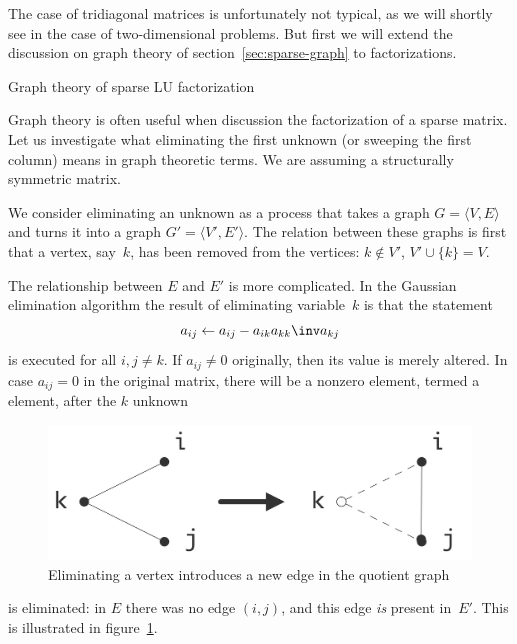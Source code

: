 The case of tridiagonal matrices is unfortunately not typical, as we
will shortly see in the case of two-dimensional problems. But first we
will extend the discussion on graph theory of
section~\ref{sec:sparse-graph} to factorizations.

 {Graph theory of sparse LU factorization}
\label{sec:lu-graph}

Graph theory is often useful when discussion the factorization of a
sparse matrix. Let us investigate what eliminating the first unknown
(or sweeping the first column) means in graph theoretic terms. We are
assuming a structurally symmetric matrix.

We consider eliminating an unknown as a process
that takes a graph $G=\langle V,E\rangle$ and
turns it into a graph $G'=\langle V',E'\rangle$. The relation between
these graphs is first that a vertex, say~$k$,
has been removed from the vertices:
$k\not\in V'$, $V'\cup \{k\}=V$.

The relationship between $E$ and $E'$ is more complicated. In the
Gaussian elimination algorithm the result of eliminating variable~$k$ is
that the statement
\[ a_{ij} \leftarrow a_{ij}- a_{ik}a_{kk}\inv a_{kj} \]
is executed for all $i,j\not=k$. If $a_{ij}\not=0$ originally, then
its value is merely altered. In case $a_{ij}=0$ in the original
matrix, there will be a nonzero element, termed a 
element, after the $k$ unknown
\begin{figure}[ht]
  \includegraphics[scale=.12]{graphics-public/ijk-eliminate}
  \caption{Eliminating a vertex introduces a new edge in the quotient
    graph}
  \label{fig:ijk-eliminate}
\end{figure}
is eliminated: in $E$ there was no edge $(i,j)$, and
this edge \emph{is} present in~$E'$. This is illustrated in
figure~\ref{fig:ijk-eliminate}.

